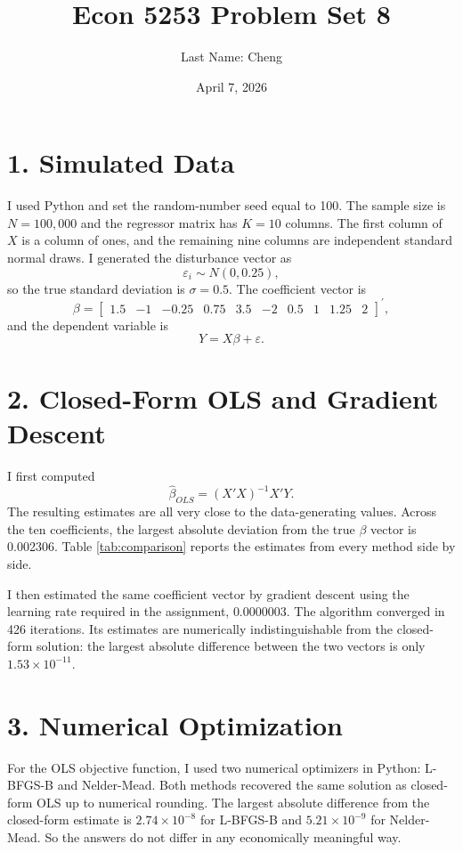 \documentclass[11pt]{article}
\title{Econ 5253 Problem Set 8}
\author{Last Name: Cheng}
\date{April 7, 2026}
\begin{document}
\maketitle

\section*{1. Simulated Data}
I used Python and set the random-number seed equal to 100.
The sample size is \(N = 100{,}000\) and the regressor matrix has \(K = 10\) columns.
The first column of \(X\) is a column of ones, and the remaining nine columns are independent standard normal draws.
I generated the disturbance vector as
\[
\varepsilon_i \sim N(0, 0.25),
\]
so the true standard deviation is \(\sigma = 0.5\).
The coefficient vector is
\[
\beta =
\begin{bmatrix}
1.5 & -1 & -0.25 & 0.75 & 3.5 & -2 & 0.5 & 1 & 1.25 & 2
\end{bmatrix}^{\prime},
\]
and the dependent variable is
\[
Y = X\beta + \varepsilon.
\]

\section*{2. Closed-Form OLS and Gradient Descent}
I first computed
\[
\hat{\beta}_{OLS} = (X'X)^{-1}X'Y.
\]
The resulting estimates are all very close to the data-generating values.
Across the ten coefficients, the largest absolute deviation from the true \(\beta\) vector is 0.002306.
Table \ref{tab:comparison} reports the estimates from every method side by side.

I then estimated the same coefficient vector by gradient descent using the learning rate required in the assignment, \(0.0000003\).
The algorithm converged in 426 iterations.
Its estimates are numerically indistinguishable from the closed-form solution: the largest absolute difference between the two vectors is only \(1.53 \times 10^{-11}\).

\section*{3. Numerical Optimization}
For the OLS objective function, I used two numerical optimizers in Python: L-BFGS-B and Nelder-Mead.
Both methods recovered the same solution as closed-form OLS up to numerical rounding.
The largest absolute difference from the closed-form estimate is \(2.74 \times 10^{-8}\) for L-BFGS-B and \(5.21 \times 10^{-9}\) for Nelder-Mead.
So the answers do not differ in any economically meaningful way.
\end{document}
